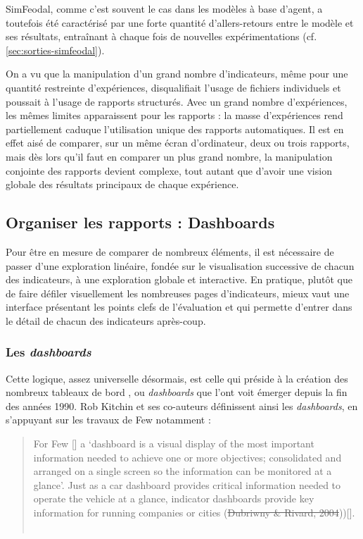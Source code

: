 	SimFeodal, comme c'est souvent le cas dans les modèles à base d'agent, a toutefois été caractérisé par une forte quantité d'allers-retours entre le modèle et ses résultats, entraînant à chaque fois de nouvelles expérimentations (cf. \cref{sec:sorties-simfeodal}). 
	
	On a vu que la manipulation d'un grand nombre d'indicateurs, même pour une quantité restreinte d'expériences, disqualifiait l'usage de fichiers individuels et poussait à l'usage de rapports structurés.
	Avec un grand nombre d'expériences, les mêmes limites apparaissent pour les rapports : la masse d'expériences rend partiellement caduque l'utilisation unique des rapports automatiques.
	Il est en effet aisé de comparer, sur un même écran d'ordinateur, deux ou trois rapports, mais dès lors qu'il faut en comparer un plus grand nombre, la manipulation conjointe des rapports devient complexe, tout autant que d'avoir une vision globale des résultats principaux de chaque expérience.

	\subsection{Organiser les rapports : Dashboards}\label{subsec:dashboards}

	Pour être en mesure de comparer de nombreux éléments, il est nécessaire de passer d'une exploration linéaire, fondée sur le visualisation successive de chacun des indicateurs, à une exploration globale et interactive.
	En pratique, plutôt que de faire défiler visuellement les nombreuses pages d'indicateurs, mieux vaut une interface présentant les points clefs de l'évaluation et qui permette d'entrer dans le détail de chacun des indicateurs après-coup.

	\subsubsection{Les \textit{dashboards}}

	Cette logique, assez universelle désormais, est celle qui préside à la création des nombreux \og tableaux de bord \fg{}, ou \og \textit{dashboards} \fg{} que l'ont voit émerger depuis la fin des années 1990.
	Rob Kitchin et ses co-auteurs définissent ainsi les \textit{dashboards}, en s'appuyant sur les travaux de Few notamment :

	\begin{quotation}
		\og For Few [\autocite[p.34]{few_information_2006}] a ‘dashboard is
		a visual display of the most important information needed to achieve one or more objectives; consolidated and arranged on a single screen so the information can be monitored at a glance’.
		Just as a car dashboard provides critical information needed to operate the vehicle at a glance, indicator dashboards provide key information for running companies or cities (\st{Dubriwny \& Rivard, 2004}))[\autocite{rivard_are_2004}].\fg{}\\
		\mbox{}~ \hfill \cite[p. 11]{kitchin_knowing_2015}
	\end{quotation}

